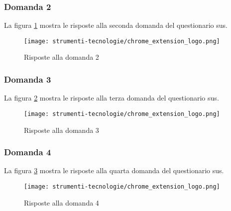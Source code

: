 \subsubsection*{Domanda 2}

\vspace{5pt}
\begin{minipage}{\textwidth}
  \par\noindent La figura \ref{fig:sus_q2} mostra le risposte alla seconda domanda del questionario \gls{sus}.
  \begin{figure}[H]
    \centering
    \texttt{[image: strumenti-tecnologie/chrome\_extension\_logo.png]} 
    \caption{Risposte alla domanda 2}
    \label{fig:sus_q2}
  \end{figure}
\end{minipage}

\subsubsection*{Domanda 3}

\vspace{5pt}
\begin{minipage}{\textwidth}
  \par\noindent La figura \ref{fig:sus_q3} mostra le risposte alla terza domanda del questionario \gls{sus}.
  \begin{figure}[H]
    \centering
    \texttt{[image: strumenti-tecnologie/chrome\_extension\_logo.png]} 
    \caption{Risposte alla domanda 3}
    \label{fig:sus_q3}
  \end{figure}
\end{minipage}

\subsubsection*{Domanda 4}

\vspace{5pt}
\begin{minipage}{\textwidth}
  \par\noindent La figura \ref{fig:sus_q4} mostra le risposte alla quarta domanda del questionario \gls{sus}.
  \begin{figure}[H]
    \centering
    \texttt{[image: strumenti-tecnologie/chrome\_extension\_logo.png]} 
    \caption{Risposte alla domanda 4}
    \label{fig:sus_q4}
  \end{figure}
\end{minipage}

